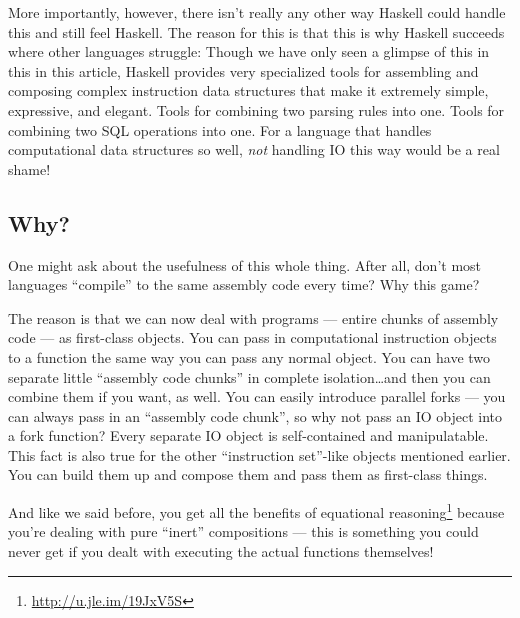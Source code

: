 \documentclass[]{article}
\renewcommand{\href}[2]{#2\footnote{\url{#1}}}
\begin{document}
More importantly, however, there isn't really any other way Haskell
could handle this and still feel Haskell. The reason for this is that
this is why Haskell succeeds where other languages struggle: Though we
have only seen a glimpse of this in this in this article, Haskell
provides very specialized tools for assembling and composing complex
instruction data structures that make it extremely simple, expressive,
and elegant. Tools for combining two parsing rules into one. Tools for
combining two SQL operations into one. For a language that handles
computational data structures so well, \emph{not} handling IO this way
would be a real shame!

\subsection{Why?}\label{why}

One might ask about the usefulness of this whole thing. After all, don't
most languages ``compile'' to the same assembly code every time? Why
this game?

The reason is that we can now deal with programs --- entire chunks of
assembly code --- as first-class objects. You can pass in computational
instruction objects to a function the same way you can pass any normal
object. You can have two separate little ``assembly code chunks'' in
complete isolation\ldots{}and then you can combine them if you want, as
well. You can easily introduce parallel forks --- you can always pass in
an ``assembly code chunk'', so why not pass an IO object into a fork
function? Every separate IO object is self-contained and manipulatable.
This fact is also true for the other ``instruction set''-like objects
mentioned earlier. You can build them up and compose them and pass them
as first-class things.

And like we said before, you get all the benefits of
\href{http://u.jle.im/19JxV5S}{equational reasoning} because you're
dealing with pure ``inert'' compositions --- this is something you could
never get if you dealt with executing the actual functions themselves!
\end{document}
